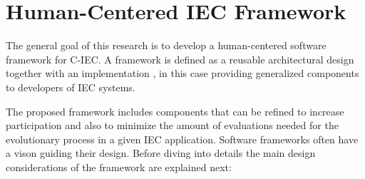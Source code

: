 \section{Human-Centered IEC Framework}
\label{sec:framework}
The general goal of this research is to develop a human-centered \cite{gasson2003human} 
software framework for C-IEC. 
A framework is defined as a reusable architectural design together
with an implementation \cite{campbell1991choices}, in this case 
providing generalized components to developers of IEC systems. 

The proposed framework includes components that can be refined to increase
participation and also to minimize the amount of evaluations needed for the evolutionary 
process in a given IEC application. Software frameworks often have 
a vison \cite{carneiro2010introducing} guiding their
design. Before diving into details the main design considerations of the
framework are explained next: 


